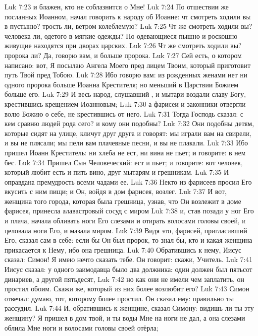 \vs Luk 7:23 и блажен, кто не соблазнится о Мне!
\rsbpar\vs Luk 7:24 По отшествии же посланных Иоанном, начал говорить к народу об Иоанне: чт смотреть ходили вы в пустыню? трость ли, ветром колеблемую?
\vs Luk 7:25 Чт же смотреть ходили вы? человека ли, одетого в мягкие одежды? Но одевающиеся пышно и роскошно живущие находятся при дворах царских.
\vs Luk 7:26 Чт же смотреть ходили вы? пророка ли? Да, говорю вам, и больше пророка.
\vs Luk 7:27 Сей есть, о котором написано: вот, Я посылаю Ангела Моего пред лицем Твоим, который приготовит путь Твой пред Тобою.
\vs Luk 7:28 Ибо говорю вам: из рожденных женами нет ни одного пророка больше Иоанна Крестителя; но меньший в Царствии Божием больше его.
\vs Luk 7:29 И весь народ, слушавший , и мытари воздали славу Богу, крестившись крещением Иоанновым;
\vs Luk 7:30 а фарисеи и законники отвергли волю Божию о себе, не крестившись от него.
\vs Luk 7:31 Тогда Господь сказал: с кем сравню людей рода сего? и кому они подобны?
\vs Luk 7:32 Они подобны детям, которые сидят на улице, кличут друг друга и говорят: мы играли вам на свирели, и вы не плясали; мы пели вам плачевные песни, и вы не плакали.
\vs Luk 7:33 Ибо пришел Иоанн Креститель: ни хлеба не ест, ни вина не пьет; и говорите: в нем бес.
\vs Luk 7:34 Пришел Сын Человеческий: ест и пьет; и говорите: вот человек, который любит есть и пить вино, друг мытарям и грешникам.
\vs Luk 7:35 И оправдана премудрость всеми чадами ее.
\rsbpar\vs Luk 7:36 Некто из фарисеев просил Его вкусить с ним пищи; и Он, войдя в дом фарисея, возлег.
\vs Luk 7:37 И вот, женщина того города, которая была грешница, узнав, что Он возлежит в доме фарисея, принесла алавастровый сосуд с миром
\vs Luk 7:38 и, став позади у ног Его и плача, начала обливать ноги Его слезами и отирать волосами головы своей, и целовала ноги Его, и мазала миром.
\vs Luk 7:39 Видя это, фарисей, пригласивший Его, сказал сам в себе: если бы Он был пророк, то знал бы, кто и какая женщина прикасается к Нему, ибо она грешница.
\vs Luk 7:40 Обратившись к нему, Иисус сказал: Симон! Я имею нечто сказать тебе. Он говорит: скажи, Учитель.
\vs Luk 7:41 Иисус сказал: у одного заимодавца было два должника: один должен был пятьсот динариев, а другой пятьдесят,
\vs Luk 7:42 но как они не имели чем заплатить, он простил обоим. Скажи же, который из них более возлюбит его?
\vs Luk 7:43 Симон отвечал: думаю, тот, которому более простил. Он сказал ему: правильно ты рассудил.
\vs Luk 7:44 И, обратившись к женщине, сказал Симону: видишь ли ты эту женщину? Я пришел в дом твой, и ты воды Мне на ноги не дал, а она слезами облила Мне ноги и волосами головы своей отёрла;
